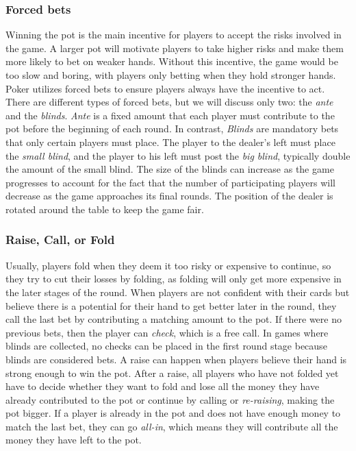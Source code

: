 \subsubsection{Forced bets}
Winning the pot is the main incentive for players to accept the risks involved in the game. A larger pot will motivate players to take higher risks and make them more likely to bet on weaker hands. Without this incentive, the game would be too slow and boring, with players only betting when they hold stronger hands. Poker utilizes forced bets to ensure players always have the incentive to act. There are different types of forced bets, but we will discuss only two: the \textit{ante} and the \textit{blinds}. \textit{Ante} is a fixed amount that each player must contribute to the pot before the beginning of each round. In contrast, \textit{Blinds} are mandatory bets that only certain players must place. The player to the dealer's left must place the \textit{small blind}, and the player to his left must post the \textit{big blind}, typically double the amount of the small blind. The size of the blinds can increase as the game progresses to account for the fact that the number of participating players will decrease as the game approaches its final rounds. The position of the dealer is rotated around the table to keep the game fair. 


\subsubsection{Raise, Call, or Fold}
Usually, players fold when they deem it too risky or expensive to continue, so they try to cut their losses by folding, as folding will only get more expensive in the later stages of the round. When players are not confident with their cards but believe there is a potential for their hand to get better later in the round, they call the last bet by contributing a matching amount to the pot. If there were no previous bets, then the player can \textit{check}, which is a free call. In games where blinds are collected, no checks can be placed in the first round stage because blinds are considered bets. A raise can happen when players believe their hand is strong enough to win the pot. After a raise, all players who have not folded yet have to decide whether they want to fold and lose all the money they have already contributed to the pot or continue by calling or \textit{re-raising}, making the pot bigger. If a player is already in the pot and does not have enough money to match the last bet, they can go \textit{all-in}, which means they will contribute all the money they have left to the pot.

